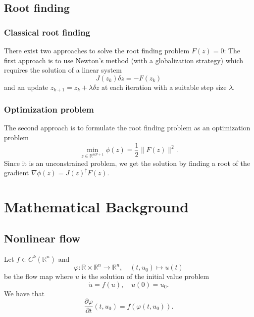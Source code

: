 \documentclass[11pt,a4paper]{article}
\begin{document}
\subsection{Root finding}
\subsubsection*{Classical root finding}
There exist two approaches to solve the root finding problem $F(z) = 0$: The first approach is to use Newton's method (with a globalization strategy) which requires the solution of a linear system
\begin{equation*}
    J(z_k)\delta z = -F(z_k)
\end{equation*}
and an update $z_{k+1} = z_k + \lambda\delta z$ at each iteration with a suitable step size $\lambda$.

\subsubsection*{Optimization problem}
The second approach is to formulate the root finding problem as an optimization problem
\begin{equation*}
    \min_{z\in\mathbb{R}^{nN+1}} \phi(z) = \frac{1}{2}\|F(z)\|^2.
\end{equation*}
Since it is an unconstrained problem, we get the solution by finding a root of the gradient $\nabla \phi(z) = J(z)^\dagger F(z)$.


\section{Mathematical Background}
\subsection{Nonlinear flow}
Let $f\in C^k(\mathbb{R}^n)$ and 
\begin{equation*}
    \varphi: \mathbb{R} \times \mathbb{R}^n \to \mathbb{R}^n, \quad (t,u_0) \mapsto u(t)
\end{equation*}
be the flow map where $u$ is the solution of the initial value problem
\begin{equation}\label{eq:ivp}
    \dot{u} = f(u), \quad u(0) = u_0.
\end{equation}
We have that \begin{equation}
    \frac{\partial \varphi}{\partial t}(t,u_0) = f(\varphi(t,u_0)).
\end{equation}
\end{document}
